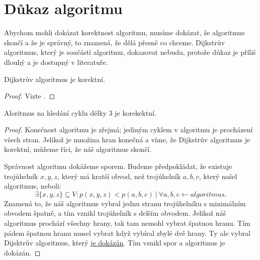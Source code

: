 \section{Důkaz algoritmu}
\label{dukaz_algoritmu}

Abychom mohli dokázat korektnost algoritmu, musíme dokázat, že algoritmus skončí a že je správný, to znamená, že dělá přesně co chceme. Dijkstrův algoritmus, který je součástí algoritmu, dokazovat nebudu, protože důkaz je příliš dlouhý a je dostupný v literatuře.
\begin{tvrzeni}
    \label{tvrzeni:dijkstra}
    Dijkstrův algoritmus je korektní.
\end{tvrzeni}
\begin{proof}
    \label{dukaz:dijkstra}
    Vizte \autocite[113]{benlFormalCorrectnessProofs1999}.
\end{proof}
\begin{tvrzeni}
    \label{tvrzeni:algoritmus}
    Aloritmus na hledání cyklu délky 3 je korekektní.
\end{tvrzeni}
\begin{proof}
    \label{dukaz:algoritmus}
Konečnost algoritmu je zřejmá; jediným cyklem v algoritmu je procházení všech stran. Jelikož je množina hran konečná a víme, že Dijkstrův algoritmus je korektní, můžeme říci, že náš algoritmus skončí.

Správnost algoritmu dokážeme sporem. Budeme předpokládat, že existuje trojúhelník $x, y, z$, který má kratší obvod, než trojúhelník $a, b, c$, který našel algoritmus, neboli:
\begin{equation*}
    \exists \{x, y, z\}\subseteq V: p(x, y, z) < p(a, b, c)~|~\forall a, b, c \leftarrow algoritmus.
\end{equation*}
Znamená to, že náš algoritmus vybral jednu stranu trojúhelníku s minimálním obvodem špatně, a tím vznikl trojúhelník s delším obvodem. Jelikož náš algoritmus prochází všechny hrany, tak tam nemohl vybrat špatnou hranu. Tím pádem špatnou hranu musel vybrat když vybíral zbylé dvě hrany. Ty ale vybral Dijsktrův algoritmus, který \hyperref[dukaz:dijkstra]{je dokázán}. Tím vznikl spor a algoritmus je dokázán. 
\end{proof}